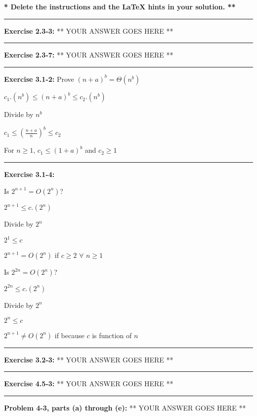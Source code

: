 \documentclass[12pt]{article}  %
\begin{document}
{\bf ** Delete the instructions and the LaTeX hints in your solution. **}

\rule{6in}{.1pt}       %


\noindent
{\bf Exercise 2.3-3:}
** YOUR ANSWER GOES HERE **

\rule{6in}{.1pt}       %

\noindent
{\bf Exercise 2.3-7:}
** YOUR ANSWER GOES HERE **

\rule{6in}{.1pt}       %

\noindent
{\bf Exercise 3.1-2:}  Prove $(n+a)^b= \Theta(n^b)$

$c_1.(n^b)\leq(n+a)^b\leq c_2.(n^b)$

Divide by $n^b$

$c_1\leq(\frac{n+a}{n})^b\leq c_2$

For $n\geq 1$, $c_1\leq (1+a)^b$ and $c_2\geq 1$


\rule{6in}{.1pt}       %

\noindent
{\bf Exercise 3.1-4:}

Is $2^{n+1}=O(2^n)$?

$2^{n+1}\leq c.(2^n)$

Divide by $2^n$

$2^{1}\leq c$

$2^{n+1}=O(2^n)$ if $c\geq 2$ $\forall$ $n\geq 1$

Is $2^{2n}=O(2^n)$?

$2^{2n}\leq c.(2^n)$

Divide by $2^n$

$2^{n}\leq c$

$2^{n+1}\neq O(2^n)$ if because $c$ is function of $n$

\rule{6in}{.1pt}       %

\noindent
{\bf Exercise 3.2-3:}
** YOUR ANSWER GOES HERE **

\rule{6in}{.1pt}       %

\noindent
{\bf Exercise 4.5-3:}
** YOUR ANSWER GOES HERE **

\rule{6in}{.1pt}       %

\noindent
{\bf Problem 4-3, parts (a) through (e):}
** YOUR ANSWER GOES HERE **
\end{document}
